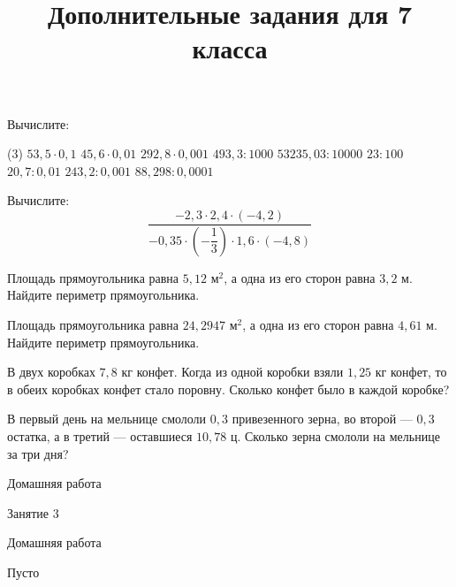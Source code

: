 \begin{class}[number=2]
\begin{listofex}
\begin{tasks}
		\end{tasks}
		\item Вычислите:
		\begin{tasks}(3)
			\task \( 53,5\cdot0,1 \)
			\task \( 45,6\cdot0,01 \)
			\task \( 292,8\cdot0,001 \)
			\task \( 493,3:1000 \)
			\task \( 53235,03:10000 \)
			\task \( 23:100 \)
			\task \( 20,7:0,01 \)
			\task \( 243,2:0,001 \)
			\task \( 88,298:0,0001 \)
		\end{tasks}
	\end{listofex}
		\title{Дополнительные задания для 7 класса}
		\begin{listofex}
		\item Вычислите: 
		\[\dfrac{-2,3\cdot2,4\cdot(-4,2)}{-0,35\cdot\left( -\dfrac{1}{3} \right)\cdot1,6\cdot(-4,8)}\]
		\item Площадь прямоугольника равна \( 5,12 \) м\( ^{2} \), а одна из его сторон равна \( 3,2 \) м. Найдите периметр прямоугольника.
		\item Площадь прямоугольника равна \( 24,2947 \) м\( ^{2} \), а одна из его сторон равна \( 4,61 \) м. Найдите периметр прямоугольника.
		\item В двух коробках \(7,8\) кг конфет. Когда из одной коробки взяли \(1,25\) кг конфет, то в обеих коробках конфет стало поровну. Сколько конфет было в каждой коробке?
		\item В первый день на мельнице смололи \(0,3\) привезенного зерна, во второй --- \(0,3\) остатка, а в третий --- оставшиеся \(10,78\) ц. Сколько зерна смололи на мельнице за три дня?
		\end{listofex}
\end{class}

\begin{homework}[number=2]
	\begin{listofex}
		\item Домашняя работа
	\end{listofex}
\end{homework}

\begin{class}[number=3]
	\begin{listofex}
		\item Занятие 3
	\end{listofex}
\end{class}

\begin{homework}[number=3]
	\begin{listofex}
		\item Домашняя работа
	\end{listofex}
\end{homework}

\begin{class}[number=4]
	\begin{listofex}
		\item Пусто
	\end{listofex}
\end{class}
